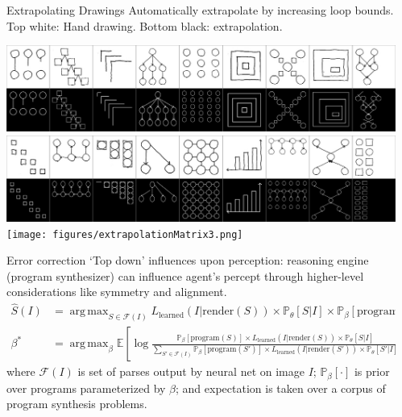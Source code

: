 \documentclass[final]{beamer}
\newcommand{\expect}{\mathds{E}} %
\newcommand{\probability}{\mathds{P}} %
\newlength{\sepwid}
\newlength{\onecolwid}
\DeclareMathOperator*{\argmax}{arg\,max} %
\newcommand{\expect}{\mathds{E}} %
\newcommand{\probability}{\mathds{P}} %
\begin{document}
\begin{frame}[t]
\begin{columns}[t]
\begin{column}{\sepwid}\end{column} %

\begin{column}{\onecolwid} %


  \begin{block}{Extrapolating Drawings}
    Automatically extrapolate by increasing loop bounds. Top white: Hand drawing. Bottom black: extrapolation.
    
      \includegraphics[width = \textwidth]{figures/extrapolationMatrix1.png}\\
  \includegraphics[width = \textwidth]{figures/extrapolationMatrix2.png}\\
  \texttt{[image: figures/extrapolationMatrix3.png]}  \\
  \end{block}

  \begin{block}{Error correction}
    `Top down' influences upon perception: reasoning engine (program synthesizer) can influence
    agent's percept through higher-level considerations like symmetry and alignment.
    \begin{align*}
      \hat{S}(I) &= \argmax_{S\in \mathcal{F}(I)} L_{\text{learned}}(I | \text{render}(S))\times \probability_\theta[S|I] \times\probability_{\beta} [ \text{program}(S)] \\
        \beta^* &= \argmax_{\beta} \expect \left[ \log \frac{\probability_{\beta} [\text{program}(S)]\times L_{\text{learned}}(I|\text{render}(S))\times \probability_\theta[S|I]}{\sum_{S'\in \mathcal{F}(I)} \probability_{\beta} [\text{program}(S')]\times L_{\text{learned}}(I|\text{render}(S'))\times \probability_\theta[S'|I]} \right]
    \end{align*}
    where $\mathcal{F}(I)$ is set of parses output by neural net on image $I$;
    $\probability_\beta[\cdot ]$ is prior over programs parameterized by $\beta$;
    and expectation is taken over a corpus of
    program synthesis problems.


\end{block}
\end{column}
\end{columns}
\end{frame}
\end{document}
